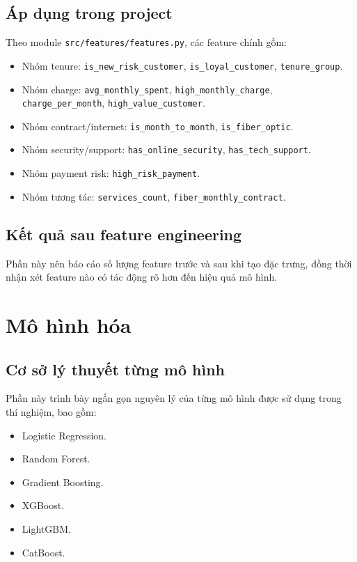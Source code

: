 \documentclass[conference]{IEEEtran}
\begin{document}
\subsection{Áp dụng trong project}
Theo module \texttt{src/features/features.py}, các feature chính gồm:
\begin{itemize}
    \item Nhóm tenure: \texttt{is\_new\_risk\_customer}, \texttt{is\_loyal\_customer}, \texttt{tenure\_group}.
    \item Nhóm charge: \texttt{avg\_monthly\_spent}, \texttt{high\_monthly\_charge}, \texttt{charge\_per\_month}, \texttt{high\_value\_customer}.
    \item Nhóm contract/internet: \texttt{is\_month\_to\_month}, \texttt{is\_fiber\_optic}.
    \item Nhóm security/support: \texttt{has\_online\_security}, \texttt{has\_tech\_support}.
    \item Nhóm payment risk: \texttt{high\_risk\_payment}.
    \item Nhóm tương tác: \texttt{services\_count}, \texttt{fiber\_monthly\_contract}.
\end{itemize}

\subsection{Kết quả sau feature engineering}
Phần này nên báo cáo số lượng feature trước và sau khi tạo đặc trưng, đồng thời nhận xét feature nào có tác động rõ hơn đến hiệu quả mô hình.

\section{Mô hình hóa}
\subsection{Cơ sở lý thuyết từng mô hình}
Phần này trình bày ngắn gọn nguyên lý của từng mô hình được sử dụng trong thí nghiệm, bao gồm:
\begin{itemize}
    \item Logistic Regression.
    \item Random Forest.
    \item Gradient Boosting.
    \item XGBoost.
    \item LightGBM.
    \item CatBoost.
\end{itemize}
\end{document}
